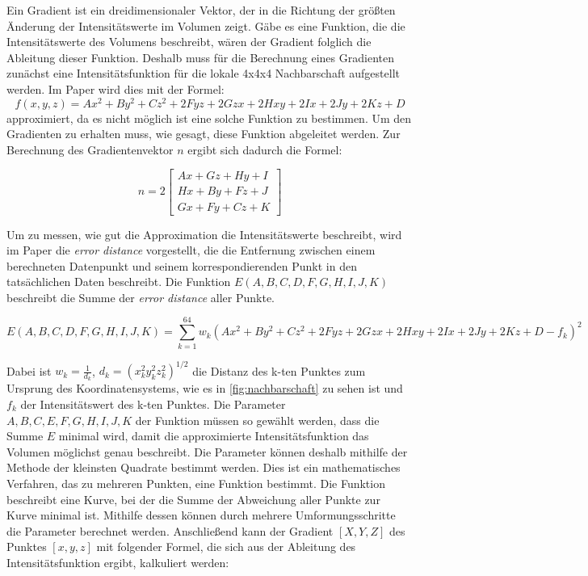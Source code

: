 Ein Gradient ist ein dreidimensionaler Vektor, der in die Richtung der größten Änderung der Intensitätswerte im Volumen zeigt. Gäbe es eine Funktion, die die Intensitätswerte des Volumens beschreibt, wären der Gradient folglich die Ableitung dieser Funktion. Deshalb muss für die Berechnung eines Gradienten zunächst eine Intensitätsfunktion für die lokale 4x4x4 Nachbarschaft aufgestellt werden. Im Paper wird dies mit der Formel:
\begin{equation}
	f(x,y,z) = Ax^{2}+By^{2}+Cz^{2}+2Fyz+2Gzx+2Hxy+2Ix+2Jy+2Kz+D
\end{equation}
approximiert, da es nicht möglich ist eine solche Funktion zu bestimmen. Um den Gradienten zu erhalten muss, wie gesagt, diese Funktion abgeleitet werden. Zur Berechnung des Gradientenvektor $n$ ergibt sich dadurch die Formel:


\begin{equation}
	n =2\begin{bmatrix}
           Ax + Gz + Hy + I \\
           Hx + By + Fz + J \\
           Gx + Fy + Cz + K
         \end{bmatrix} 
\end{equation}


Um zu messen, wie gut die Approximation die Intensitätswerte beschreibt, wird im Paper die \textit{error distance} vorgestellt, die die Entfernung zwischen einem berechneten Datenpunkt und seinem korrespondierenden Punkt in den tatsächlichen Daten beschreibt. Die Funktion $E(A,B,C,D,F,G,H,I,J,K)$ beschreibt die Summe der \textit{error distance} aller Punkte.


\begin{equation}
  E(A,B,C,D,F,G,H,I,J,K) = \sum\limits_{k=1}^{64}  w_{k}(Ax^{2}+By^{2}+Cz^{2}+2Fyz+2Gzx+2Hxy+2Ix+2Jy+2Kz+D - f_{k})^2
\end{equation}

Dabei ist $w_{k} = \frac{1}{d_{k}}$, $d_{k} =(x_{k}^2y_{k}^2z_{k}^2)^{1/2}$  die Distanz des k-ten Punktes zum Ursprung des Koordinatensystems, wie es in \autoref{fig:nachbarschaft} zu sehen ist und $f_{k}$ der Intensitätswert des k-ten Punktes. Die Parameter $A,B,C,E,F,G,H,I,J,K$  der Funktion müssen so gewählt werden, dass die Summe $E$ minimal wird, damit die approximierte Intensitätsfunktion das Volumen möglichst genau beschreibt. Die Parameter können deshalb mithilfe der Methode der kleinsten Quadrate bestimmt werden. Dies ist ein mathematisches Verfahren, das zu mehreren Punkten, eine Funktion bestimmt. Die Funktion beschreibt eine Kurve, bei der die Summe der Abweichung aller Punkte zur Kurve minimal ist. Mithilfe dessen können durch mehrere Umformungsschritte die Parameter berechnet werden. Anschließend kann der Gradient $[X, Y, Z]$ des Punktes $[x, y, z]$ mit folgender Formel, die sich aus der Ableitung des Intensitätsfunktion ergibt, kalkuliert werden:


